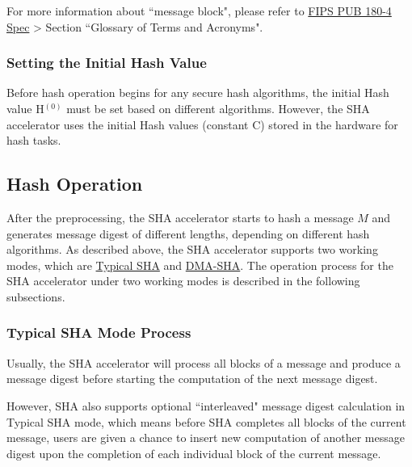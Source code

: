 \documentclass[main\_\_EN.tex]{subfiles}
\begin{document}
\begin{tiplisting}
\vspace{-0.5em}
For more information about ``message block", please refer to \href{https://doi.org/10.6028/NIST.FIPS.180-4}{FIPS PUB 180-4 Spec} > Section ``Glossary of Terms and Acronyms".
\end{tiplisting}

\subsubsection{Setting the Initial Hash Value}\label{sec:sha-initial-hash}

Before hash operation begins for any secure hash algorithms, the initial Hash value H$^{(0)}$ must be set based on different algorithms. However, the SHA accelerator uses the initial Hash values (constant C) stored in the hardware for hash tasks.

\subsection{Hash Operation}\label{sec:sha-hash-operation}

After the preprocessing, the \chipname{} SHA accelerator starts to hash a message \begin{math}M\end{math} and generates message digest of different lengths, depending on different hash algorithms. As described above, the \chipname{} SHA accelerator supports two working modes, which are \hyperref[sec:sha-typical-sha]{Typical SHA} and \hyperref[sec:sha-dma-sha]{DMA-SHA}. The
operation process for the SHA accelerator under two working modes is described in the following subsections.

\subsubsection{Typical SHA Mode Process}\label{sec:sha-typical-sha}

Usually, the SHA accelerator will process all blocks of a message and produce a message digest before starting the computation of the next message digest.

However, \chipname{} SHA also supports optional ``interleaved" message digest calculation in Typical SHA mode, which means before SHA completes all blocks of the current message, users are given a chance to insert new computation of another message digest upon the completion of each individual block of the current message.
\end{document}

